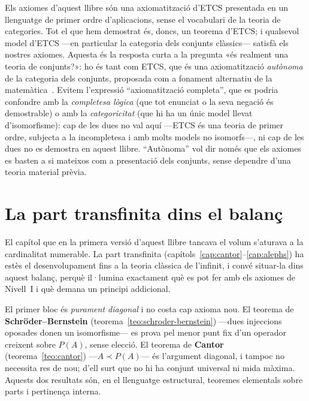 \begin{observacio}\label{obs:tesi-etcs}
Els axiomes d'aquest llibre són una axiomatització d'ETCS presentada en un
llenguatge de primer ordre d'aplicacions, sense el vocabulari de la teoria
de categories. Tot el que hem demostrat és, doncs, un teorema d'ETCS; i
qualsevol model d'ETCS ---en particular la categoria dels conjunts
clàssics--- satisfà els nostres axiomes. Aquesta és la resposta curta a la
pregunta «és realment una teoria de conjunts?»: ho és tant com ETCS, que
és una axiomatització \emph{autònoma} de la categoria dels conjunts,
proposada com a fonament alternatiu de la matemàtica~\cite{lawvere-rosebrugh,mclarty-catset}.
Evitem l'expressió \enquote{axiomatització completa}, que es podria confondre
amb la \emph{completesa lògica} (que tot enunciat o la seva negació és
demostrable) o amb la \emph{categoricitat} (que hi ha un únic model llevat
d'isomorfisme): cap de les dues no val aquí ---ETCS és una teoria de primer
ordre, subjecta a la incompletesa i amb molts models no isomorfs---, ni cap de
les dues no es demostra en aquest llibre. \enquote{Autònoma} vol dir només que
els axiomes es basten a si mateixos com a presentació dels conjunts, sense dependre d'una teoria material prèvia.
\end{observacio}

\section{La part transfinita dins el balanç}\label{sec:transfinit-balanc}

El capítol que en la primera versió d'aquest llibre tancava el volum
s'aturava a la cardinalitat numerable. La part transfinita
(capítols~\ref{cap:cantor}--\ref{cap:alephs}) ha estès el desenvolupament
fins a la teoria clàssica de l'infinit, i convé situar-la dins aquest
balanç, perquè il·lumina exactament què es pot fer amb els axiomes de
Nivell~I i què demana un principi addicional.

El primer bloc és \emph{purament diagonal} i no costa cap axioma nou. El
teorema de \textbf{Schröder--Bernstein} (teorema~\ref{teo:schroder-bernstein})
---dues injeccions oposades donen un isomorfisme--- es prova pel menor punt
fix d'un operador creixent sobre \(P(A)\), sense elecció. El teorema de
\textbf{Cantor} (teorema~\ref{teo:cantor}) ---\(A\prec P(A)\)--- és
l'argument diagonal, i tampoc no necessita res de nou; d'ell surt que no hi
ha conjunt universal ni mida màxima. Aquests dos resultats són, en el
llenguatge estructural, teoremes elementals sobre parts i pertinença interna.

